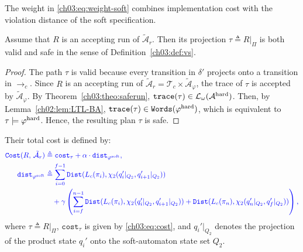 The weight in \eqref{ch03:eq:weight-soft} combines implementation cost with
the violation distance of the soft specification.

\begin{theorem}\label{ch03:theo:safety}
Assume that $R$ is an accepting run of $\tilde{\mathcal{A}}_{r}$. Then its
projection $\tau \triangleq R|_{\Pi}$ is both valid and safe in the sense of
Definition~\ref{ch03:def:vs}.
\end{theorem}

\begin{proof}
The path $\tau$ is valid because every transition in $\delta'$ projects onto a
transition in $\longrightarrow_c$. Since $R$ is an accepting run of
$\tilde{\mathcal{A}}_{r}
= \mathcal{T}_c \times \tilde{\mathcal{A}}_{\varphi}$, the trace of $\tau$ is
accepted by $\tilde{\mathcal{A}}_{\varphi}$. By
Theorem~\ref{ch03:theo:saferun},
$\texttt{trace}(\tau) \in
\mathcal{L}_{\omega}(\mathcal{A}^{\textup{hard}})$. Then, by
Lemma~\ref{ch02:lem:LTL-BA},
$\texttt{trace}(\tau) \in \texttt{Words}(\varphi^{\textup{hard}})$, which is
equivalent to $\tau \models \varphi^{\textup{hard}}$. Hence, the resulting plan $\tau$ is safe.
\end{proof}

Their total cost is
defined by:
\begin{equation}
\color{blue}
\begin{aligned}
\texttt{Cost}(R,\, \tilde{\mathcal{A}}_{r})
&\triangleq
\texttt{cost}_{\tau}
+ \alpha \cdot \texttt{dist}_{\varphi^{\textup{soft}}}, \\
\texttt{dist}_{\varphi^{\textup{soft}}}
&\triangleq
\sum_{i=0}^{f-1}\texttt{Dist}(L_c(\pi_i),
\chi_2(q_i'|_{Q_2},q_{i+1}'|_{Q_2})) \\
&\quad+\gamma\left(\sum_{i=f}^{n-1}\texttt{Dist}(L_c(\pi_i),
\chi_2(q_i'|_{Q_2},q_{i+1}'|_{Q_2}))
+\texttt{Dist}(L_c(\pi_n),\chi_2(q_n'|_{Q_2},q_f'|_{Q_2}))\right),
\end{aligned}
\label{ch03:eq:prod-cost3}
\end{equation}
where $\tau \triangleq R|_{\Pi}$, $\texttt{cost}_{\tau}$ is given by
\eqref{ch03:eq:cost}, and $q_i'|_{Q_2}$ denotes the projection of the product
state $q_i'$ onto the soft-automaton state set $Q_2$.

